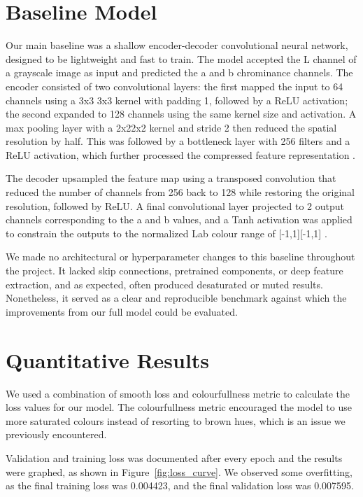 \documentclass{article} %
\begin{document}
\section{Baseline Model}
\label{baseline}

Our main baseline was a shallow encoder-decoder convolutional neural network, designed to be lightweight and fast to train. The model accepted the L channel of a grayscale image as 
input and predicted the a and b chrominance channels. The encoder consisted of two convolutional layers: the first mapped the input to 64 channels using a 3x3 3x3 kernel with padding 1, 
followed by a ReLU activation; the second expanded to 128 channels using the same kernel size and activation. A max pooling layer with a 2x22x2 kernel and stride 2 then reduced the 
spatial resolution by half. This was followed by a bottleneck layer with 256 filters and a ReLU activation, which further processed the compressed feature representation \citep{leatvanich2025image}.

The decoder upsampled the feature map using a transposed convolution that reduced the number of channels from 256 back to 128 while restoring the original resolution, followed by ReLU. 
A final convolutional layer projected to 2 output channels corresponding to the a and b values, and a Tanh activation was applied to constrain the outputs to the normalized Lab colour 
range of [-1,1][-1,1] \citep{rosebrock2019bwcolorization}.

We made no architectural or hyperparameter changes to this baseline throughout the project. It lacked skip connections, pretrained components, or deep 
feature extraction, and as expected, often produced desaturated or muted results. Nonetheless, it served as a clear and reproducible benchmark against which the improvements from our 
full model could be evaluated.

\section{Quantitative Results}
\label{quant_results}

We used a combination of smooth loss and colourfullness metric to calculate the loss values for our model. The colourfullness metric encouraged the model to use more saturated colours
instead of resorting to brown hues, which is an issue we previously encountered. 

Validation and training loss was documented after every epoch and the results were graphed, as shown in Figure~\ref{fig:loss_curve}. We observed some overfitting, as the final training loss was 0.004423, and the final validation loss was 0.007595.
\end{document}
